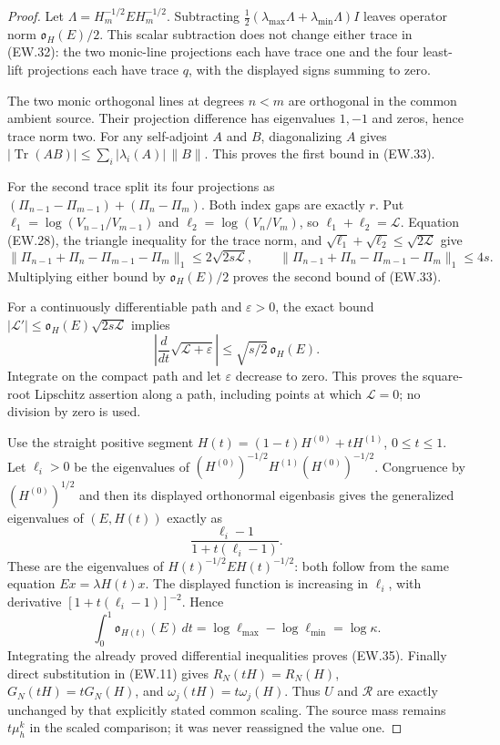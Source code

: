 \documentclass[11pt]{article}
\newcommand{\Tr}{\operatorname{Tr}}
\begin{document}
\begin{proof}
Let $\Lambda=H_m^{-1/2}EH_m^{-1/2}$. Subtracting
$\tfrac12(\lambda_{\max}\Lambda+\lambda_{\min}\Lambda)I$
leaves operator norm $\mathfrak o_H(E)/2$. This scalar subtraction
does not change either trace in (EW.32): the two monic-line
projections each have trace one and the four least-lift projections
each have trace $q$, with the displayed signs summing to zero.

The two monic orthogonal lines at degrees $n<m$ are orthogonal
in the common ambient source. Their projection difference has
eigenvalues $1,-1$ and zeros, hence trace norm two. For any
self-adjoint $A$ and $B$, diagonalizing $A$ gives
$|\Tr(AB)|\le\sum_i|\lambda_i(A)|\,\|B\|$.
This proves the first bound in (EW.33).

For the second trace split its four projections as
$(\Pi_{n-1}-\Pi_{m-1})+(\Pi_n-\Pi_m)$. Both index gaps
are exactly $r$. Put
$\ell_1=\log(V_{n-1}/V_{m-1})$ and
$\ell_2=\log(V_n/V_m)$, so $\ell_1+\ell_2=\mathscr L$.
Equation (EW.28), the triangle inequality for the trace norm, and
$\sqrt{\ell_1}+\sqrt{\ell_2}\le\sqrt{2\mathscr L}$ give
\[
 \|\Pi_{n-1}+\Pi_n-\Pi_{m-1}-\Pi_m\|_1
 \le 2\sqrt{2s\mathscr L},\qquad
 \|\Pi_{n-1}+\Pi_n-\Pi_{m-1}-\Pi_m\|_1\le4s.
\]
Multiplying either bound by $\mathfrak o_H(E)/2$ proves the
second bound of (EW.33).

For a continuously differentiable path and $\varepsilon>0$, the exact bound
$|\mathscr L'|\le\mathfrak o_H(E)\sqrt{2s\mathscr L}$ implies
\[
 \left|\frac d{dt}\sqrt{\mathscr L+\varepsilon}\right|
 \le\sqrt{s/2}\,\mathfrak o_H(E).
\]
Integrate on the compact path and let $\varepsilon$ decrease to
zero. This proves the square-root Lipschitz assertion along a path,
including points at which $\mathscr L=0$; no division by zero is
used.

Use the straight positive segment
$H(t)=(1-t)H^{(0)}+tH^{(1)}$, $0\le t\le1$.
Let $\ell_i>0$ be the eigenvalues of
$(H^{(0)})^{-1/2}H^{(1)}(H^{(0)})^{-1/2}$.
Congruence by $(H^{(0)})^{1/2}$ and then its displayed orthonormal
eigenbasis gives the generalized eigenvalues of $(E,H(t))$ exactly
as
\[
 \frac{\ell_i-1}{1+t(\ell_i-1)}.
\]
These are the eigenvalues of $H(t)^{-1/2}EH(t)^{-1/2}$:
both follow from the same equation $Ex=\lambda H(t)x$.
The displayed function is increasing in $\ell_i$, with derivative
$[1+t(\ell_i-1)]^{-2}$. Hence
\[
 \int_0^1\mathfrak o_{H(t)}(E)\,dt
 =\log\ell_{\max}-\log\ell_{\min}=\log\kappa.
\]
Integrating the already proved differential inequalities proves
(EW.35). Finally direct substitution in (EW.11) gives
$R_N(tH)=R_N(H)$, $G_N(tH)=tG_N(H)$, and
$\omega_j(tH)=t\omega_j(H)$. Thus $U$ and $\mathscr R$ are
exactly unchanged by that explicitly stated common scaling. The
source mass remains $t\mu_h^k$ in the scaled comparison; it was
never reassigned the value one.
\end{proof}
\end{document}
